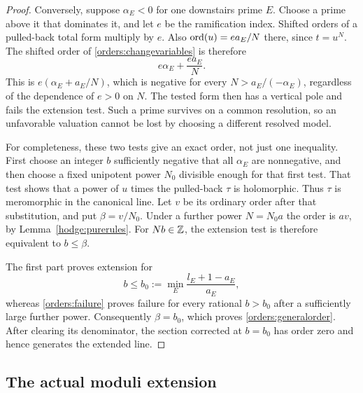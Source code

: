 \begin{proof}
Conversely, suppose \(\alpha_E<0\) for one downstairs prime \(E\).
Choose a prime above it that dominates it, and let \(e\) be the
ramification index.  Shifted orders of a pulled-back total form
multiply by \(e\).  Also
\(\operatorname{ord}(u)=ea_E/N\) there, since \(t=u^N\).
The shifted order of \eqref{orders:changevariables} is therefore
\begin{equation}
                   e\alpha_E+\frac{ea_E}{N}.
 \label{orders:failure}
\end{equation}
This is \(e(\alpha_E+a_E/N)\), which is negative for every
\(N>a_E/(-\alpha_E)\), regardless of the dependence of \(e>0\)
on \(N\).  The
tested form then has a vertical pole and fails the extension test.
Such a prime survives on a common resolution, so an unfavorable
valuation cannot be lost by choosing a different resolved model.

For completeness, these two tests give an exact order, not just
one inequality.  First choose an integer \(b\) sufficiently negative
that all \(\alpha_E\) are nonnegative, and then choose a fixed
unipotent power \(N_0\) divisible enough for that first test.
That test shows that a power of \(u\) times the pulled-back \(\tau\) is
holomorphic.  Thus \(\tau\) is meromorphic in the canonical line.
Let \(v\) be its ordinary order after that substitution, and put
\(\beta=v/N_0\).  Under a further power \(N=N_0a\) the order is
\(av\), by Lemma~\ref{hodge:purerules}.  For \(Nb\in\mathbb Z\), the
extension test is therefore equivalent to \(b\leq\beta\).

The first part proves extension for
\[
 b\leq b_0:=\min_E\frac{l_E+1-a_E}{a_E},
\]
whereas \eqref{orders:failure} proves failure for every rational
\(b>b_0\) after a sufficiently large further power.  Consequently
\(\beta=b_0\), which proves \eqref{orders:generalorder}.  After
clearing its denominator, the section corrected at \(b=b_0\)
has order zero and hence generates the extended line.
\end{proof}

\subsection{The actual moduli extension}
\label{orders:actualextension}

